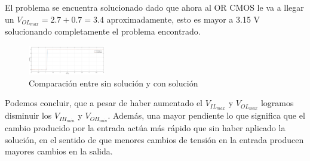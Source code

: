 El problema se encuentra solucionado dado que ahora al OR CMOS le va a llegar un $V_{OL_{max}}=2.7+0.7=3.4$ aproximadamente, esto es mayor a 3.15 V solucionando completamente el problema encontrado.

\begin{figure}[H]
	\centering
	\includegraphics[width=0.3\textwidth]{Ejercicio5/Comparacion.png}
	\caption{Comparación entre sin solución y con solución}
\end{figure}

Podemos concluir, que a pesar de haber aumentado el $V_{IL_{max}}$ y $V_{OL_{max}}$ logramos disminuir los $V_{IH_{min}}$ y $V_{OH_{min}}$. Además, una mayor pendiente lo que significa que el cambio producido por la entrada actúa más rápido que sin haber aplicado la solución, en el sentido de que menores cambios de tensión en la entrada producen mayores cambios en la salida.